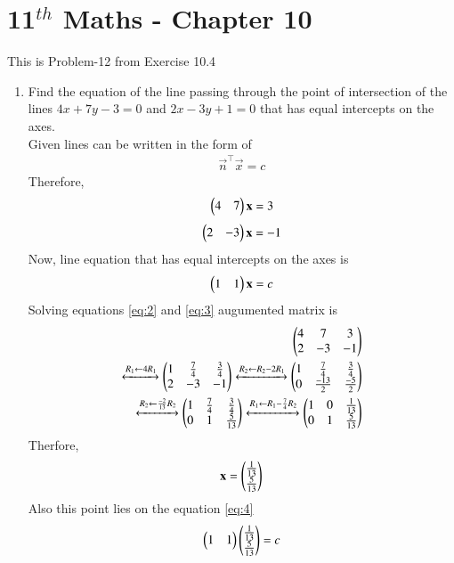 \documentclass[12pt]{article}
\begin{document}
\section*{11$^{th}$ Maths - Chapter 10}
This is Problem-12 from Exercise 10.4
\begin{enumerate}
    \item Find the equation of the line passing through the point of intersection of the lines $4x + 7y - 3 = 0$ and $2x - 3y + 1 = 0$ that has equal intercepts on the axes.\\
    \solution 
    Given lines can be written in the form of \begin{align}
        \Vec{n}^{\top}\Vec{x} = c
    \end{align}
   Therefore,
		\begin{align}
       \begin{pmatrix}4&7\end{pmatrix}\mathbf{x}=3
       \label{eq:2}
   \end{align} 
   \begin{align}
       \begin{pmatrix}2&-3\end{pmatrix}\mathbf{x}=-1
       \label{eq:3}
   \end{align}
   Now, line equation that has equal intercepts on the axes is
   \begin{align}
       \myvec{1 & 1}\Vec{x}=c
       \label{eq:4}
   \end{align}
   Solving equations \eqref{eq:2} and \eqref{eq:3}
		augumented matrix is
 \begin{align}
    \begin{pmatrix}4&7&3\\2&-3&-1\end{pmatrix}\\
    \xleftrightarrow{R_1 \leftarrow 4 R_1}
    \begin{pmatrix}1&\frac{7}{4}&\frac{3}{4}\\2&-3&-1\end{pmatrix}
    \xleftrightarrow{R_2 \leftarrow R_2 - 2R_1}
    \begin{pmatrix}1&\frac{7}{4}&\frac{3}{4}\\0&\frac{-13}{2}&\frac{-5}{2}\end{pmatrix}\\
    \xleftrightarrow{R_2 \leftarrow \frac{-2}{13}R_2}
    \begin{pmatrix}1&\frac{7}{4}&\frac{3}{4}\\0&1&\frac{5}{13}\end{pmatrix}
    \xleftrightarrow{R_1 \leftarrow R_1-\frac{7}{4}R_2}
    \begin{pmatrix}1&0&\frac{1}{13}\\0&1&\frac{5}{13}\end{pmatrix}
\end{align}
Therfore, \begin{align}    
\mathbf{x} = \begin{pmatrix}\frac{1}{13}\\\frac{5}{13}\end{pmatrix}
\end{align}
Also this point lies on the equation \eqref{eq:4}
\begin{align}
    \myvec{1 & 1}\myvec{\frac{1}{13}\\\frac{5}{13}} = c\\

\end{align}
\end{enumerate}
\end{document}
